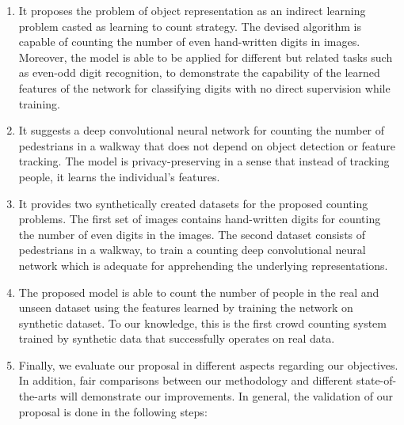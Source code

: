 \begin{enumerate}
	\item It proposes the problem of object representation as an indirect learning problem casted as learning to count strategy. The devised algorithm is capable of counting the number of even hand-written digits in images. Moreover, the model is able to be applied for different but related tasks such as even-odd digit recognition, to demonstrate the capability of the learned features of the network for classifying digits with no direct supervision while training. 
	
	\item It suggests a deep convolutional neural network for counting the number of pedestrians in a walkway that does not depend on object detection or feature tracking. The model is privacy-preserving in a sense that instead of tracking people, it learns the individual's features.
	\item It provides two synthetically created datasets for the proposed counting problems. The first set of images contains hand-written digits for counting the number of even digits in the images. The second dataset consists of pedestrians in a walkway, to train a counting deep convolutional neural network which is adequate for apprehending the underlying representations.
	 

	\item The proposed model is able to count the number of people in the real and unseen dataset using the features learned by training the network on synthetic dataset. To our knowledge, this is the first crowd counting system trained by synthetic data that successfully operates on real data. 

	\item Finally, we evaluate our proposal in different aspects regarding our objectives. In addition, fair comparisons between our methodology and different state-of-the-arts will demonstrate our improvements. In general, the validation of our proposal is done in the following steps:


\end{enumerate}
